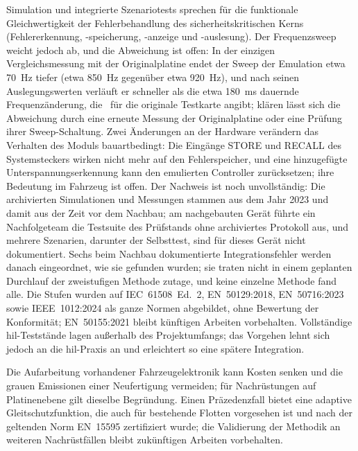 Simulation und integrierte Szenariotests sprechen für die funktionale Gleichwertigkeit der Fehlerbehandlung des sicherheitskritischen Kerns (Fehlererkennung, -speicherung, -anzeige und -auslesung). Der Frequenzsweep weicht jedoch ab, und die Abweichung ist offen: In der einzigen Vergleichsmessung mit der Originalplatine endet der Sweep der Emulation etwa 70~Hz tiefer (etwa 850~Hz gegenüber etwa 920~Hz), und nach seinen Auslegungswerten verläuft er schneller als die etwa 180~ms dauernde Frequenzänderung, die~\cite{dolata2023} für die originale Testkarte angibt; klären lässt sich die Abweichung durch eine erneute Messung der Originalplatine oder eine Prüfung ihrer Sweep-Schaltung. Zwei Änderungen an der Hardware verändern das Verhalten des Moduls bauartbedingt: Die Eingänge STORE und RECALL des Systemsteckers wirken nicht mehr auf den Fehlerspeicher, und eine hinzugefügte Unterspannungserkennung kann den emulierten Controller zurücksetzen; ihre Bedeutung im Fahrzeug ist offen. Der Nachweis ist noch unvollständig: Die archivierten Simulationen und Messungen stammen aus dem Jahr 2023 und damit aus der Zeit vor dem Nachbau; am nachgebauten Gerät führte ein Nachfolgeteam die Testsuite des Prüfstands ohne archiviertes Protokoll aus, und mehrere Szenarien, darunter der Selbsttest, sind für dieses Gerät nicht dokumentiert. Sechs beim Nachbau dokumentierte Integrationsfehler werden danach eingeordnet, wie sie gefunden wurden; sie traten nicht in einem geplanten Durchlauf der zweistufigen Methode zutage, und keine einzelne Methode fand alle. Die Stufen wurden auf IEC~61508~Ed.~2, EN~50129:2018, EN~50716:2023 sowie IEEE~1012:2024 als ganze Normen abgebildet, ohne Bewertung der Konformität; EN~50155:2021 bleibt künftigen Arbeiten vorbehalten. Vollständige \gls{hil}-Teststände lagen außerhalb des Projektumfangs; das Vorgehen lehnt sich jedoch an die \gls{hil}-Praxis an und erleichtert so eine spätere Integration.

Die Aufarbeitung vorhandener Fahrzeugelektronik kann Kosten senken und die grauen Emissionen einer Neufertigung vermeiden; für Nachrüstungen auf Platinenebene gilt dieselbe Begründung. Einen Präzedenzfall bietet eine adaptive Gleitschutzfunktion, die auch für bestehende Flotten vorgesehen ist und nach der geltenden Norm EN~15595 zertifiziert wurde; die Validierung der Methodik an weiteren Nachrüstfällen bleibt zukünftigen Arbeiten vorbehalten.
